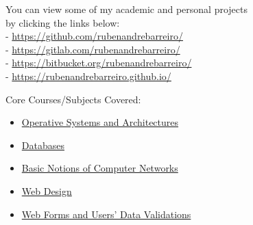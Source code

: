 \documentclass[10pt,a4paper,academicons]{altacv}
\begin{document}
\divider

{\footnotesize You can view some of my academic and personal projects\\
by clicking the links below:\\
- \href{https://github.com/rubenandrebarreiro/}{https://github.com/rubenandrebarreiro/}\\
- \href{https://gitlab.com/rubenandrebarreiro/}{https://gitlab.com/rubenandrebarreiro/}\\
- \href{https://bitbucket.org/rubenandrebarreiro/}{https://bitbucket.org/rubenandrebarreiro/}\\
- \href{https://rubenandrebarreiro.github.io/}{https://rubenandrebarreiro.github.io/}\\
}

\divider

\clearpage


{\small\faBook\hspace{0.5em}Core Courses/Subjects Covered:

\begin{itemize}

\item \hspace{0.5em} \href{https://en.wikipedia.org/wiki/Operating_system}{Operative Systems and Architectures}
\item \hspace{0.5em} \href{https://en.wikipedia.org/wiki/Database}{Databases}
\item \hspace{0.5em} \href{https://en.wikipedia.org/wiki/Computer_network}{Basic Notions of Computer Networks}
\item \hspace{0.5em} \href{https://en.wikipedia.org/wiki/Web_design}{Web Design}
\item \hspace{0.5em} \href{https://en.wikipedia.org/wiki/Form_(HTML)}{Web Forms and Users' Data Validations}

\end{itemize}
}
\end{document}
